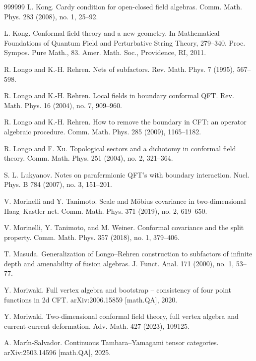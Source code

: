 \documentclass[11pt,b5paper,notitlepage]{article}
\theoremstyle{definition}
\theoremstyle{plain}
\numberwithin{equation}{section}
\begin{document}
\begin{thebibliography}{999999}
L. Kong.
Cardy condition for open-closed field algebras.
Comm. Math. Phys. 283 (2008), no. 1, 25--92.

L. Kong.
Conformal field theory and a new geometry.
In Mathematical Foundations of Quantum Field and Perturbative String Theory, 279--340.
Proc. Sympos. Pure Math., 83.
Amer. Math. Soc., Providence, RI, 2011.


R. Longo and K.-H. Rehren.
Nets of subfactors.
Rev. Math. Phys. 7 (1995), 567--598.


R. Longo and K.-H. Rehren.
Local fields in boundary conformal QFT.
Rev. Math. Phys. 16 (2004), no. 7, 909--960.


R. Longo and K.-H. Rehren.
How to remove the boundary in CFT: an operator algebraic procedure.
Comm. Math. Phys. 285 (2009), 1165--1182.


R. Longo and F. Xu. Topological sectors and a dichotomy in conformal field theory. Comm. Math. Phys. 251 (2004), no. 2, 321--364.


S. L. Lukyanov.
Notes on parafermionic QFT's with boundary interaction.
Nucl. Phys. B 784 (2007), no. 3, 151--201.






V. Morinelli and Y. Tanimoto.
Scale and M\"obius covariance in two-dimensional Haag--Kastler net.
Comm. Math. Phys. 371 (2019), no. 2, 619--650.

V. Morinelli, Y. Tanimoto, and M. Weiner. Conformal covariance and the split property. Comm. Math. Phys. 357 (2018), no. 1, 379--406.



T. Masuda.
Generalization of Longo--Rehren construction to subfactors of infinite depth and amenability of fusion algebras.
J. Funct. Anal. 171 (2000), no. 1, 53--77.


Y. Moriwaki.
Full vertex algebra and bootstrap -- consistency of four point functions in 2d CFT. arXiv:2006.15859 [math.QA], 2020.

Y. Moriwaki.
Two-dimensional conformal field theory, full vertex algebra and current-current deformation.
Adv. Math. 427 (2023), 109125.



A. Mar\'in-Salvador.
Continuous Tambara--Yamagami tensor categories.
arXiv:2503.14596 [math.QA], 2025.



\end{thebibliography}
\end{document}
